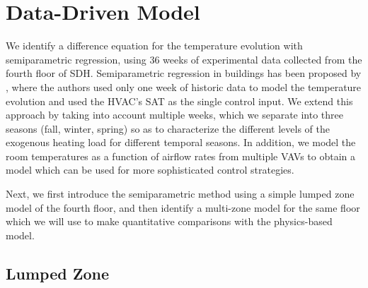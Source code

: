 
\section{Data-Driven Model}
\label{sec:Data_Driven_Model}
We identify a difference equation for the temperature evolution with semiparametric regression, using 36 weeks of experimental data collected from the fourth floor of SDH. Semiparametric regression in buildings has been proposed by \cite{Aswani:2012aa}, where the authors used only one week of historic data to model the temperature evolution and used the HVAC's SAT as the single control input. %
We extend this approach by taking into account multiple weeks, which we separate into three seasons (fall, winter, spring) so as to characterize the different levels of the exogenous heating load for different temporal seasons. 
In addition, we model the room temperatures as a function of airflow rates from multiple VAVs to obtain a model which can be used for more sophisticated control strategies.

Next, we first introduce the semiparametric method using a simple lumped zone model of the fourth floor, and then identify a multi-zone model for the same floor which we will use to make quantitative comparisons with the physics-based model.

\subsection{Lumped Zone}
\label{sec:Lumped_Zone}
